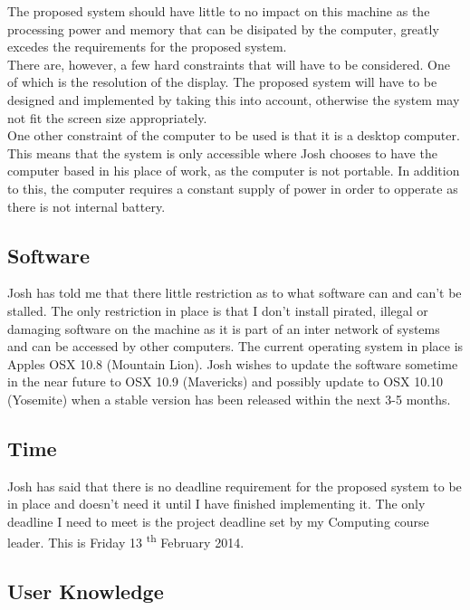 \documentclass[a4paper,12pt]{report}
\begin{document}
\noindent The proposed system should have little to no impact on this machine as the processing power and memory that can be disipated by the computer, greatly excedes the requirements for the proposed system.\\

\noindent There are, however, a few hard constraints that will have to be considered. One of which is the resolution of the display. The proposed system will have to be designed and implemented by taking this into account, otherwise the system may not fit the screen size appropriately.\\

\noindent One other constraint of the computer to be used is that it is a desktop computer. This means that the system is only accessible where Josh chooses to have the computer based in his place of work, as the computer is not portable. In addition to this, the computer requires a constant supply of power in order to opperate as there is not internal battery.\\

\subsection{Software}

Josh has told me that there little restriction as to what software can and can't be stalled. The only restriction in place is that I don't install pirated, illegal or damaging software on the machine as it is part of an inter network of systems and can be accessed by other computers. The current operating system in place is Apples OSX 10.8 (Mountain Lion). Josh wishes to update the software sometime in the near future to OSX 10.9 (Mavericks) and possibly update to OSX 10.10 (Yosemite) when a stable version has been released within the next 3-5 months.

\subsection{Time}

Josh has said that there is no deadline requirement for the proposed system to be in place and doesn't need it until I have finished implementing it. The only deadline I need to meet is the project deadline set by my Computing course leader. This is Friday 13 \textsuperscript{th} February 2014.

\subsection{User Knowledge}
\end{document}

